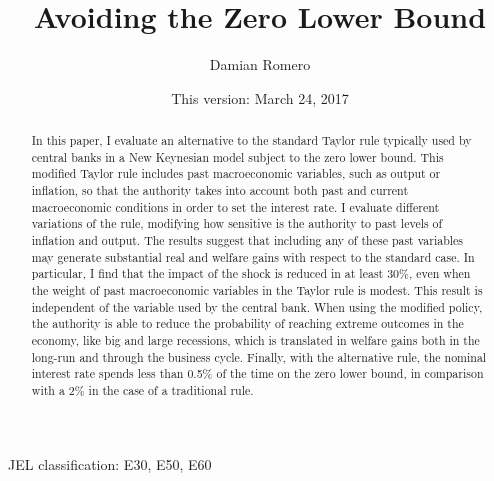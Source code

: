 \documentclass[12pt]{article}
\title{Avoiding the Zero Lower Bound}
\author{Damian Romero}
\date{This version: March 24, 2017}
\numberwithin{equation}{section}
\begin{document}
	
\maketitle\thispagestyle{empty}

\begin{abstract}

	\noindent In this paper, I evaluate an alternative to the standard Taylor rule typically used by central banks in a New Keynesian model subject to the zero lower bound. This modified Taylor rule includes past macroeconomic variables, such as output or inflation, so that the authority takes into account both past and current macroeconomic conditions in order to set the interest rate. I evaluate different variations of the rule, modifying how sensitive is the authority to past levels of inflation and output. The results suggest that including any of these past variables may generate substantial real and welfare gains with respect to the standard case. In particular, I find that the impact of the shock is reduced in at least 30\%, even when the weight of past macroeconomic variables in the Taylor rule is modest. This result is independent of the variable used by the central bank. When using the modified policy, the authority is able to reduce the probability of reaching extreme outcomes in the economy, like big and large recessions, which is translated in welfare gains both in the long-run and through the business cycle. Finally, with the alternative rule, the nominal interest rate spends less than 0.5\% of the time on the zero lower bound, in comparison with a 2\% in the case of a traditional rule.

\end{abstract}	
	
JEL classification: E30, E50, E60
\end{document}
